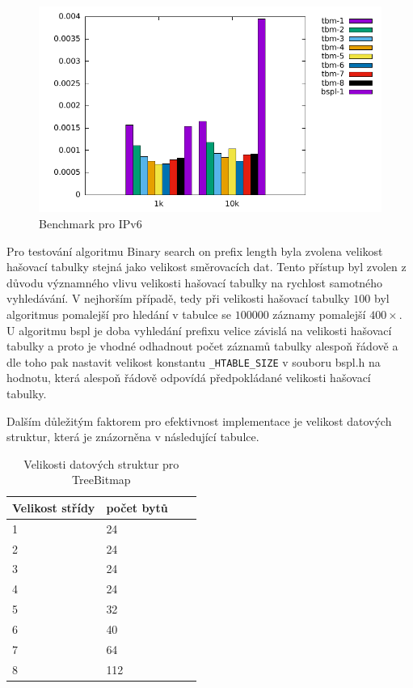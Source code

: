 \begin{figure}[!htbp]
	\centering
	\includegraphics[scale=1]{fig/lpm-ipv6.pdf}
	\caption{Benchmark pro IPv6}
\end{figure}\label{fig:lpm-ipv4}

Pro testování algoritmu Binary search on prefix length byla zvolena velikost hašovací tabulky
stejná jako velikost směrovacích dat. Tento přístup byl zvolen z důvodu významného vlivu
velikosti hašovací tabulky na rychlost samotného vyhledávání. V nejhorším případě, tedy při
velikosti hašovací tabulky $100$ byl algoritmus pomalejší pro hledání v tabulce se $100 000$ záznamy pomalejší
$400\times$.
U algoritmu bspl je doba vyhledání prefixu velice závislá na velikosti hašovací tabulky a proto je vhodné odhadnout počet záznamů tabulky alespoň řádově a dle toho pak nastavit velikost konstantu {\tt \_HTABLE\_SIZE} v souboru bspl.h na hodnotu, která alespoň řádově odpovídá předpokládané velikosti hašovací tabulky.

Dalším důležitým faktorem pro efektivnost implementace je velikost datových struktur, která je znázorněna v následující tabulce.

\begin{table}[!htbp]
	\center
	\label{tab:lpm-input}
    \begin{tabular}{|l|l|l|l|}
    \hline
    Velikost střídy & počet bytů \\ \hline
    1 & 24 \\ \hline
    2 & 24 \\ \hline
    3 & 24 \\ \hline
    4 & 24 \\ \hline
    5 & 32 \\ \hline
    6 & 40 \\ \hline
    7 & 64 \\ \hline
    8 & 112 \\ \hline
    \end{tabular}
	\caption{Velikosti datových struktur pro TreeBitmap}
\end{table}

